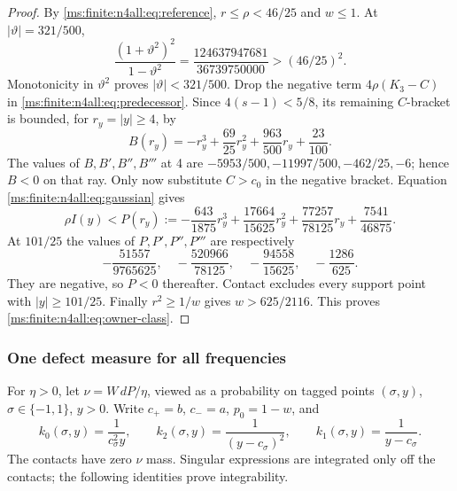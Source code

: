 \begin{proof}
By \eqref{ms:finite:n4all:eq:reference}, $r\le\rho<46/25$ and $w\le1$.
At $|\vartheta|=321/500$,
\[
 \frac{(1+\vartheta^2)^2}{1-\vartheta^2}
   =\frac{124637947681}{36739750000}>(46/25)^2.
\]
Monotonicity in $\vartheta^2$ proves $|\vartheta|<321/500$.
Drop the negative term $4\rho(K_3-C)$ in
\eqref{ms:finite:n4all:eq:predecessor}. Since $4(s-1)<5/8$, its remaining
$C$-bracket is bounded, for $r_y=|y|\ge4$, by
\[
 B(r_y)=-r_y^3+\frac{69}{25}r_y^2
                 +\frac{963}{500}r_y+\frac{23}{100}.
\]
The values of $B,B',B'',B'''$ at 4 are
$-5953/500,-11997/500,-462/25,-6$; hence $B<0$ on that ray.
Only now substitute $C>c_0$ in the negative bracket. Equation
\eqref{ms:finite:n4all:eq:gaussian} gives
\[
 \rho I(y)<P(r_y):=-\frac{643}{1875}r_y^3
 +\frac{17664}{15625}r_y^2+\frac{77257}{78125}r_y
 +\frac{7541}{46875}.
\]
At $101/25$ the values of $P,P',P'',P'''$ are respectively
\[
 -\frac{51557}{9765625},\quad -\frac{520966}{78125},\quad
 -\frac{94558}{15625},\quad -\frac{1286}{625}.
\]
They are negative, so $P<0$ thereafter. Contact excludes every
support point with $|y|\ge101/25$. Finally $r^2\ge1/w$ gives
$w>625/2116$. This proves \eqref{ms:finite:n4all:eq:owner-class}.
\end{proof}

\subsubsection{One defect measure for all frequencies}
For $\eta>0$, let $\nu=W\,dP/\eta$, viewed as a probability on
tagged points $(\sigma,y)$, $\sigma\in\{-1,1\}$, $y>0$.
Write $c_+=b$, $c_-=a$, $p_0=1-w$, and
\[
 k_0(\sigma,y)=\frac1{c_\sigma^2y},\qquad
 k_2(\sigma,y)=\frac1{(y-c_\sigma)^2},\qquad
 k_1(\sigma,y)=\frac1{y-c_\sigma}.
\]
The contacts have zero $\nu$ mass. Singular expressions are integrated
only off the contacts; the following identities prove integrability.

